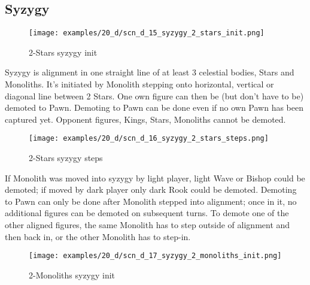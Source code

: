 \subsection*{Syzygy}

\vspace*{-1.2\baselineskip}
\noindent
\begin{figure}[!h]
\texttt{[image: examples/20\_d/scn\_d\_15\_syzygy\_2\_stars\_init.png]}
\caption{2-Stars syzygy init}
\label{fig:scn_d_15_syzygy_2_stars_init}
\end{figure}

Syzygy is alignment in one straight line of at least 3 celestial bodies, Stars and Monoliths. It's initiated by
Monolith stepping onto horizontal, vertical or diagonal line between 2 Stars. One own figure can then be (but
don't have to be) demoted to Pawn. Demoting to Pawn can be done even if no own Pawn has been captured yet.
Opponent figures, Kings, Stars, Monoliths cannot be demoted.

\clearpage %

\noindent
\begin{figure}[!h]
\texttt{[image: examples/20\_d/scn\_d\_16\_syzygy\_2\_stars\_steps.png]}
\caption{2-Stars syzygy steps}
\label{fig:scn_d_16_syzygy_2_stars_steps}
\end{figure}

If Monolith was moved into syzygy by light player, light Wave or Bishop could be demoted; if moved by dark player
only dark Rook could be demoted. Demoting to Pawn can only be done after Monolith stepped into alignment; once in
it, no additional figures can be demoted on subsequent turns. To demote one of the other aligned figures, the same
Monolith has to step outside of alignment and then back in, or the other Monolith has to step-in.

\clearpage %

\noindent
\begin{figure}[!h]
\texttt{[image: examples/20\_d/scn\_d\_17\_syzygy\_2\_monoliths\_init.png]}
\caption{2-Monoliths syzygy init}
\label{fig:scn_d_17_syzygy_2_monoliths_init}
\end{figure}

